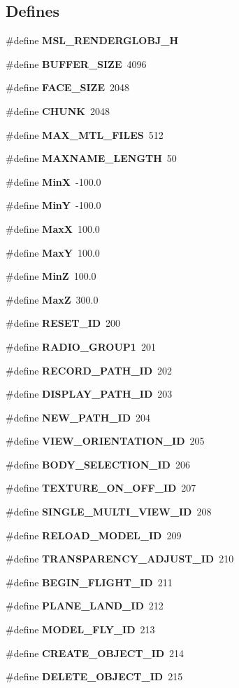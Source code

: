\subsection*{Defines}
\begin{CompactItemize}
\item 
\#define {\bf MSL\_\-RENDERGLOBJ\_\-H}
\item 
\#define {\bf BUFFER\_\-SIZE}\ 4096
\item 
\#define {\bf FACE\_\-SIZE}\ 2048
\item 
\#define {\bf CHUNK}\ 2048
\item 
\#define {\bf MAX\_\-MTL\_\-FILES}\ 512
\item 
\#define {\bf MAXNAME\_\-LENGTH}\ 50
\item 
\#define {\bf Min\-X}\ -100.0
\item 
\#define {\bf Min\-Y}\ -100.0
\item 
\#define {\bf Max\-X}\ 100.0
\item 
\#define {\bf Max\-Y}\ 100.0
\item 
\#define {\bf Min\-Z}\ 100.0
\item 
\#define {\bf Max\-Z}\ 300.0
\item 
\#define {\bf RESET\_\-ID}\ 200
\item 
\#define {\bf RADIO\_\-GROUP1}\ 201
\item 
\#define {\bf RECORD\_\-PATH\_\-ID}\ 202
\item 
\#define {\bf DISPLAY\_\-PATH\_\-ID}\ 203
\item 
\#define {\bf NEW\_\-PATH\_\-ID}\ 204
\item 
\#define {\bf VIEW\_\-ORIENTATION\_\-ID}\ 205
\item 
\#define {\bf BODY\_\-SELECTION\_\-ID}\ 206
\item 
\#define {\bf TEXTURE\_\-ON\_\-OFF\_\-ID}\ 207
\item 
\#define {\bf SINGLE\_\-MULTI\_\-VIEW\_\-ID}\ 208
\item 
\#define {\bf RELOAD\_\-MODEL\_\-ID}\ 209
\item 
\#define {\bf TRANSPARENCY\_\-ADJUST\_\-ID}\ 210
\item 
\#define {\bf BEGIN\_\-FLIGHT\_\-ID}\ 211
\item 
\#define {\bf PLANE\_\-LAND\_\-ID}\ 212
\item 
\#define {\bf MODEL\_\-FLY\_\-ID}\ 213
\item 
\#define {\bf CREATE\_\-OBJECT\_\-ID}\ 214
\item 
\#define {\bf DELETE\_\-OBJECT\_\-ID}\ 215

\end{CompactItemize}
